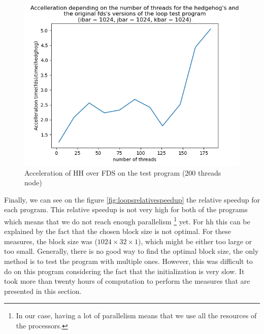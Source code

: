 \begin{figure}[ht!]
  \begin{center}
    \includegraphics[scale=0.6]{img/fds-loops/speedup.png}
    \caption{Acceleration of HH over FDS on the test program (200 threads node)}
    \label{fig:loopsspeedup}
  \end{center}
\end{figure}

Finally, we can see on the figure \ref{fig:loopsrelativespeedup} the relative
speedup for each program. This relative speedup is not very high for both of the
programs which means that we do not reach enough parallelism \footnote{In our
case, having a lot of parallelism means that we use all the resources of the
processors.} yet. For \gls{hh} this can be explained by the fact that the chosen
block size is not optimal. For these measures, the block size was
($1024\times32\times1$), which might be either too large or too small.
Generally, there is no good way to find the optimal block size, the only method
is to test the program with multiple ones. However, this was difficult to do on
this program considering the fact that the initialization is very slow. It took
more than twenty hours of computation to perform the measures that are presented
in this section.

